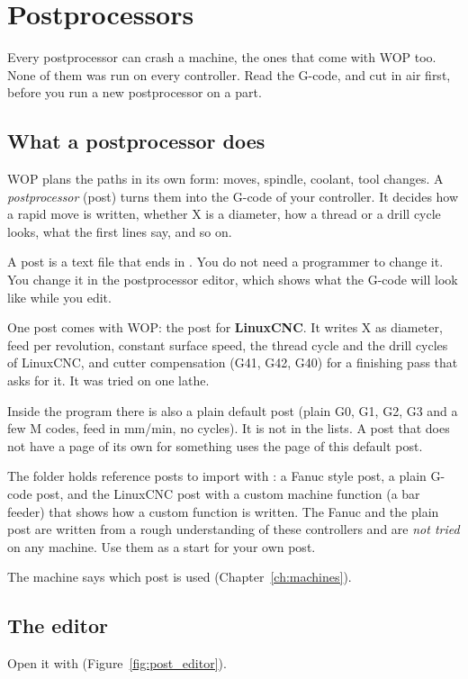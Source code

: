 \chapter{Postprocessors}\label{ch:posts}

\begin{warningbox}
Every postprocessor can crash a machine, the ones that come with WOP too. None of them was run on every controller. Read the G-code, and cut in air first, before you run a new postprocessor on a part.
\end{warningbox}

\section{What a postprocessor does}
WOP plans the paths in its own form: moves, spindle, coolant, tool changes. A \emph{postprocessor} (post) turns them into the G-code of your controller. It decides how a rapid move is written, whether X is a diameter, how a thread or a drill cycle looks, what the first lines say, and so on.

A post is a text file that ends in . You do not need a programmer to change it. You change it in the postprocessor editor, which shows what the G-code will look like while you edit.

One post comes with WOP: the post for \textbf{LinuxCNC}. It writes X as diameter, feed per revolution, constant surface speed, the thread cycle and the drill cycles of LinuxCNC, and cutter compensation (G41, G42, G40) for a finishing pass that asks for it. It was tried on one lathe.

Inside the program there is also a plain default post (plain G0, G1, G2, G3 and a few M codes, feed in mm/min, no cycles). It is not in the lists. A post that does not have a page of its own for something uses the page of this default post.

The folder  holds reference posts to import with : a Fanuc style post, a plain G-code post, and the LinuxCNC post with a custom machine function (a bar feeder) that shows how a custom function is written. The Fanuc and the plain post are written from a rough understanding of these controllers and are \emph{not tried} on any machine. Use them as a start for your own post.

The machine says which post is used (Chapter~\ref{ch:machines}).

\section{The editor}\label{sec:posts:editor}
Open it with  (Figure~\ref{fig:post_editor}).

